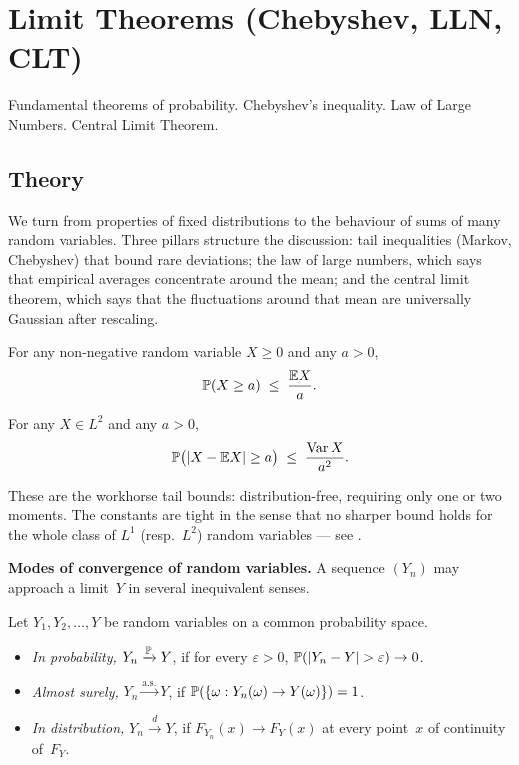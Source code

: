 
\section{Limit Theorems (Chebyshev, LLN, CLT)}
\label{sec:1.2.05-limit-theorems}

\begin{ticket}
Fundamental theorems of probability. Chebyshev's inequality. Law of Large Numbers. Central Limit Theorem.
\end{ticket}

\subsection*{Theory}

We turn from properties of fixed distributions to the behaviour of
sums of many random variables. Three pillars structure the
discussion: tail inequalities (Markov, Chebyshev) that bound rare
deviations; the law of large numbers, which says that empirical
averages concentrate around the mean; and the central limit theorem,
which says that the fluctuations around that mean are universally
Gaussian after rescaling.

\begin{theorem}
\label{thm:markov-ineq}
For any non-negative random variable $X \geq 0$ and any $a > 0$,
\[
  \mathbb{P}(X \geq a) \;\leq\; \frac{\mathbb{E} X}{a}.
\]
\end{theorem}

\begin{theorem}
\label{thm:chebyshev-ineq}
For any $X \in L^2$ and any $a > 0$,
\[
  \mathbb{P}\bigl(|X - \mathbb{E} X| \geq a\bigr) \;\leq\; \frac{\operatorname{Var} X}{a^2}.
\]
\end{theorem}

These are the workhorse tail bounds: distribution-free, requiring
only one or two moments. The constants are tight in the sense that
no sharper bound holds for the whole class of $L^1$ (resp.~$L^2$)
random variables — see \cite[Ch.~II, \S~1]{Shiryaev1989}.

\medskip
\noindent\textbf{Modes of convergence of random variables.} A
sequence $(Y_n)$ may approach a limit~$Y$ in several inequivalent
senses.

\begin{definition}
\label{def:convergence-modes}
Let $Y_1, Y_2, \dots, Y$ be random variables on a common probability
space.
\begin{itemize}
  \item \emph{In probability,} $Y_n \xrightarrow{\mathbb{P}} Y$, if for every
        $\varepsilon > 0$, $\mathbb{P}(|Y_n - Y| > \varepsilon) \to 0$.
  \item \emph{Almost surely,} $Y_n \xrightarrow{\text{a.s.}} Y$, if
        $\mathbb{P}(\{\omega : Y_n(\omega) \to Y(\omega)\}) = 1$.
  \item \emph{In distribution,} $Y_n \xrightarrow{d} Y$, if
        $F_{Y_n}(x) \to F_Y(x)$ at every point~$x$ of continuity
        of~$F_Y$.
\end{itemize}
\end{definition}

